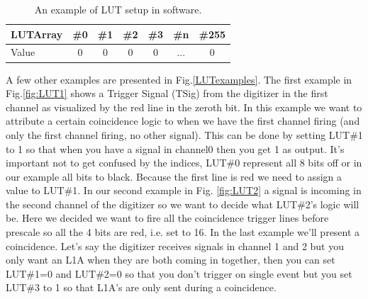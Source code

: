 \begin{table}[htbp!] 
\caption{An example of LUT setup in software.}
\centering
\label{table:LUTtable}
\begin{tabular}{l c c c c c c}
\toprule
LUTArray & \#0 & \#1 & \#2 & \#3 & \#n & \#255 \\
\midrule
Value & 0 & 0 & 0  & 0 & ... & 0 \\
\bottomrule
\end{tabular}
\end{table}

A few other examples are presented in Fig.\ref{LUTexamples}. The first example in Fig.\ref{fig:LUT1} shows a Trigger Signal (TSig) from the digitizer in the first channel as visualized by the red line in the zeroth bit. In this example we want to attribute a certain coincidence logic to when we have the first channel firing (and only the first channel firing, no other signal). This can be done by setting LUT\#1 to 1 so that when you have a signal in channel0 then you get 1 as output. It's important not to get confused by the indices, LUT\#0 represent all 8 bits off or in our example all bits to black. Because the first line is red we need to assign a value to LUT\#1. In our second example in Fig. \ref{fig:LUT2} a signal is incoming in the second channel of the digitizer so we want to decide what LUT\#2's logic will be. Here we decided we want to fire all the coincidence trigger lines before prescale so all the 4 bits are red, i.e. set to 16. In the last example we'll present a coincidence. Let's say the digitizer receives signals in channel 1 and 2 but you only want an L1A when they are both coming in together, then you can set LUT\#1=0 and LUT\#2=0 so that you don't trigger on single event but you set LUT\#3 to 1 so that L1A's are only sent during a coincidence.


